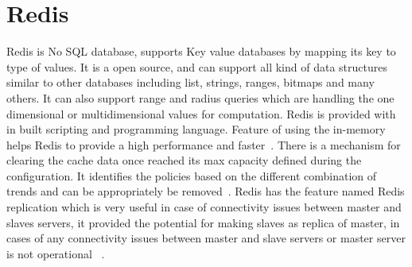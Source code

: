 \section{Redis}

Redis is No SQL database, supports Key value databases by mapping its key 
to type of values. It is a open source, and can support all kind of data 
structures similar to other databases including list, strings, ranges, 
bitmaps and many others. It can also support range and radius queries 
which are handling the one dimensional or multidimensional values for 
computation. Redis is provided with in built scripting and programming 
language. Feature of using the in-memory helps Redis to provide a high 
performance and faster~\cite{hid-sp18-520-Redis}.
There is a mechanism for clearing the cache data once reached its max 
capacity defined during the configuration. It identifies the policies 
based on the different combination of trends and can be appropriately 
be removed~\cite{hid-sp18-520-RedisModulescac}.
Redis has the feature named Redis replication which is very useful in case of 
connectivity issues between master and slaves servers, it provided the 
potential for making slaves as replica of master, in cases of any connectivity 
issues between master and slave servers or master server is not operational
~\cite{hid-sp18-520-RedisModules}.
